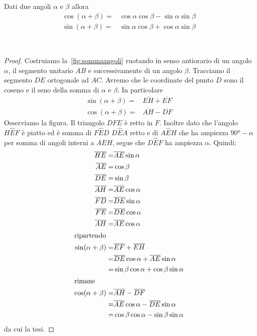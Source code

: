 \begin{thm}\label{thm:Cosenosenosomma}
	Dati due angoli $\alpha$ e $\beta$ allora
	\begin{align*}
	\cos(\alpha+\beta)=&\cos\alpha\cos\beta-\sin\alpha\sin\beta \\
	\sin(\alpha+\beta)=&\sin\alpha\cos\beta+\cos\alpha\sin\beta 
	\end{align*}
\end{thm}~\cite{Brett2020}
\begin{proof}
Costruiamo la~\vref{fig:sommaangoli} ruotando in senso antiorario di un angolo$\alpha$, il segmento unitario $AB$ e successivamente di un angolo $\beta$. Tracciamo il segmento $DE$ ortogonale ad $AC$. Avremo che le coordinate del punto $D$ sono il coseno e il seno  della somma  di $\alpha$ e $\beta$.  In particolare 
\begin{align*}
\sin(\alpha+\beta)=&\overline{EH}+\overline{EF}\\
\cos(\alpha+\beta)=&\overline{AH}-\overline{DF}
\end{align*}
Osserviamo la figura. Il triangolo $DFE$ è retto in $F$. Inoltre dato che l'angolo $H\hat{E}F$ è piatto ed è somma di $F\hat{E}D$ $D\hat{E}A$ retto e di $A\hat{E}H$ che ha ampiezza  $\ang{90;;}-\alpha$ per somma di angoli interni a $AEH$, segue che $D\hat{E}F$ ha ampiezza $\alpha$. Quindi:
\begin{align*}
\overline{HE}=&\overline{AE}\sin\alpha\\
\overline{AE}=&\cos\beta\\
\overline{DE}=&\sin\beta\\
\overline{AH}=&\overline{AE}\cos\alpha\\
\overline{FD}=&\overline{DE}\sin\alpha\\
\overline{FE}=&\overline{DE}\cos\alpha\\
\overline{AH}=&\overline{AE}\cos\alpha\\
\intertext{ripartendo}
\sin(\alpha+\beta)=&\overline{EF}+\overline{EH}\\
=&\overline{DE}\cos\alpha+\overline{AE}\sin\alpha\\
=&\sin\beta\cos\alpha+\cos\beta\sin\alpha\\
\intertext{rimane}
\cos(\alpha+\beta)=&\overline{AH}-\overline{DF}\\
=&\overline{AE}\cos\alpha-\overline{DE}\sin\alpha\\
=&\cos\beta\cos\alpha-\sin\beta\sin\alpha\\
\end{align*}
da cui la tesi.
\end{proof}
